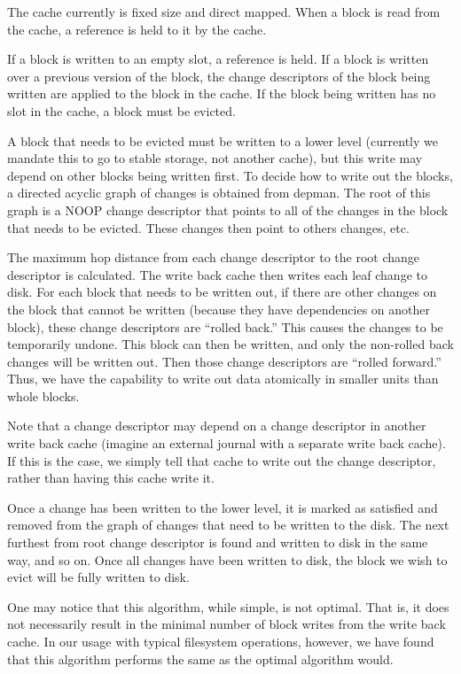 The cache currently is fixed size and direct mapped. When a block is
read from the cache, a reference is held to it by the cache.

If a block is written to an empty slot, a reference is held. If a
block is written over a previous version of the block, the change
descriptors of the block being written are applied to the block in the
cache. If the block being written has no slot in the cache, a block
must be evicted.

A block that needs to be evicted must be written to a lower level
(currently we mandate this to go to stable storage, not another
cache), but this write may depend on other blocks being written
first. To decide how to write out the blocks, a directed acyclic graph
of changes is obtained from depman. The root of this graph is a NOOP
change descriptor that points to all of the changes in the block that
needs to be evicted. These changes then point to others changes, etc.

The maximum hop distance from each change descriptor to the root
change descriptor is calculated. The write back cache then writes each
leaf change to disk. For each block that needs to be written out, if
there are other changes on the block that cannot be written (because
they have dependencies on another block), these change descriptors are
``rolled back.'' This causes the changes to be temporarily
undone. This block can then be written, and only the non-rolled back
changes will be written out. Then those change descriptors are
``rolled forward.'' Thus, we have the capability to write out data
atomically in smaller units than whole blocks.

Note that a change descriptor may depend on a change descriptor in
another write back cache (imagine an external journal with a separate
write back cache). If this is the case, we simply tell that cache to
write out the change descriptor, rather than having this cache write
it.

Once a change has been written to the lower level, it is marked as
satisfied and removed from the graph of changes that need to be
written to the disk. The next furthest from root change descriptor is
found and written to disk in the same way, and so on. Once all changes
have been written to disk, the block we wish to evict will be fully
written to disk.

One may notice that this algorithm, while simple, is not optimal. That
is, it does not necessarily result in the minimal number of block
writes from the write back cache. In our usage with typical filesystem
operations, however, we have found that this algorithm performs the
same as the optimal algorithm would.

